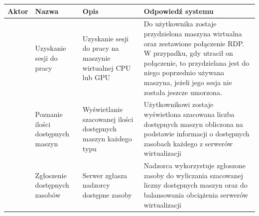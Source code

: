 \documentclass[12pt]{article}
\begin{document}
\begin{center}
	\begin{table}[h!]
		\begin{tabular}{|p{}|p{}|p{}|p{}|}
			\hline Aktor                                                                    & Nazwa                             & Opis                                                          & Odpowiedź systemu                                                                                                                                                                                                                       \\ \hline
			\multirow{14}{=}{\rotatebox{90}{Użytkownik}}                                    & Uzyskanie sesji do pracy          & Uzyskanie sesji do pracy na maszynie wirtualnej CPU lub GPU   & Do użytkownika zostaje przydzielona maszyna wirtualna oraz zestawione połączenie RDP. W przypadku, gdy utracił on połączenie, to przydzielana jest do niego poprzednio używana maszyna, jeżeli jego sesja nie została jeszcze umorzona. \\ \cline{2-4}
			                                                                                & Poznanie ilości dostępnych maszyn & Wyświetlanie szacowanej ilości dostępnych maszyn każdego typu & Użytkownikowi zostaje wyświetlona szacowana liczba dostępnych maszyn obliczona na podstawie informacji o dostępnych zasobach każdego z serwerów wirtualizacji                                                                           \\ \hline
			\multirow[b]{5}{=}{\rotatebox{90}{\parbox{1cm}{Serwer \newline wirtualizacji}}} & Zgłoszenie dostępnych zasobów     & Serwer zgłasza nadzorcy dostępne zasoby                       & Nadzorca wykorzystuje zgłoszone zasoby do wyliczania szacowanej liczny dostępnych maszyn oraz do balansowania obciążenia serwerów wirtualizacji                                                                                         \\
			\hline
		\end{tabular}
	\end{table}
\end{center}

\newpage
\end{document}
